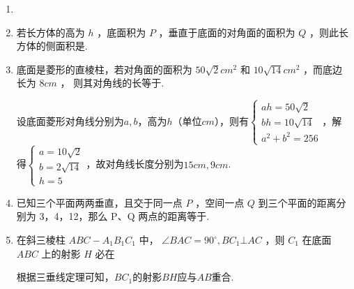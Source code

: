 \begin{enumerate}
    \item 
    \item 若长方体的高为 $h$ ，底面积为 ${P}$ ，垂直于底面的对角面的面积为 ${Q}$ ，则此长方体的侧面积是.
    \item 底面是菱形的直棱柱，若对角面的面积为 ${50}\sqrt{2}c{m}^{2}$ 和 ${10}\sqrt{14}c{m}^{2}$ ，而底边长为 ${8cm}$ ， 则其对角线的长等于\blkda[3]{$15cm, 9cm$}.
    \begin{jieda}
        设底面菱形对角线分别为$a, b$，高为$h$（单位$cm$），则有$\left\{\begin{array}{l}
             ah = 50\sqrt{2} \\
             bh = 10\sqrt{14} \\
             a^2+b^2 = 256
        \end{array}\right.$，解得$\left\{\begin{array}{l}
             a = 10\sqrt{2} \\
             b = 2\sqrt{14} \\
             h = 5
        \end{array}\right.$，故对角线长度分别为$15cm, 9cm$.
    \end{jieda}
    \item 已知三个平面两两垂直，且交于同一点 ${P}$ ，空间一点 ${Q}$ 到三个平面的距离分别为 3，4，12，那么 P、Q 两点的距离等于.
    \item 在斜三棱柱 ${{ABC}} - {{A}}_{1}{{B}}_{1}{{C}}_{1}$ 中， $\angle {{BAC}} = {90}^{ \circ  },{{{BC}}}_{1} \bot  {{AC}}$ ，则 ${{C}}_{1}$ 在底面 ${{ABC}}$ 上的射影 ${H}$ 必在
    \begin{jieda}
        根据三垂线定理可知，$BC_1$的射影$BH$应与$AB$重合.
    \end{jieda}

\end{enumerate}
